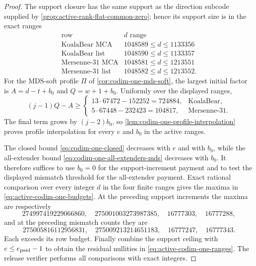 \documentclass[11pt,a4paper]{amsart}
\numberwithin{equation}{section}
\theoremstyle{remark}
\begin{document}
\begin{proof}
The support closure has the same support as the direction subcode supplied
by \cref{prop:active-rank-flat-common-zero}; hence its support size is in
the exact ranges
\[
\begin{array}{c|c}
\text{row}&d\text{ range}\\ \hline
\text{KoalaBear MCA}&1048589\le d\le1133356\\
\text{KoalaBear list}&1048590\le d\le1133357\\
\text{Mersenne-31 MCA}&1048581\le d\le1213551\\
\text{Mersenne-31 list}&1048582\le d\le1213552.
\end{array}
\]
For the MDS-soft profile \(\Pi\) of
\cref{cor:codim-one-mds-soft}, the largest initial factor is
\(A=d-t+b_0\) and \(Q=w+1+b_0\).  Uniformly over the displayed ranges,
\[
 (j-1)Q-A\ge
 \begin{cases}
 13\cdot67472-152252=724884,&\text{KoalaBear},\\
 5\cdot67448-232423=104817,&\text{Mersenne-31}.
 \end{cases}
\]
The final term grows by \((j-2)b_0\), so
\cref{lem:codim-one-profile-interpolation} proves profile interpolation
for every \(e\) and \(b_0\) in the active ranges.

The closed bound \eqref{eq:codim-one-closed} decreases with \(e\) and
with \(b_0\), while the all-extender bound
\eqref{eq:codim-one-all-extenders-mds} decreases with \(b_0\).  It
therefore suffices to use \(b_0=0\) for the support-increment payment and
to test the displayed mismatch threshold for the all-extender payment.
Exact rational comparison over every integer \(d\) in the four finite
ranges gives the maxima in \eqref{eq:active-codim-one-budgets}.  At the
preceding support increments the maxima are respectively
\[
274997419229066860,
\quad275001003273987385,
\quad16777303,
\quad16777288,
\]
and at the preceding mismatch counts they are
\[
275005816112956831,
\quad275009213214651183,
\quad16777247,
\quad16777343.
\]
Each exceeds its row budget.  Finally combine the support ceiling with
\(e\le e_{\rm paid}-1\) to obtain the residual nullities in
\eqref{eq:active-codim-one-ranges}.  The release verifier performs all
comparisons with exact integers.
\end{proof}
\end{document}
